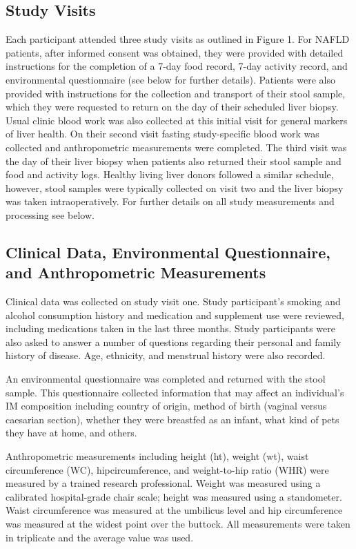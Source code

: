 \subsection{Study Visits}
Each participant attended three study visits as outlined in Figure 1. For NAFLD patients, after informed consent was obtained, they were provided with detailed instructions for the completion of a 7-day food record, 7-day activity record, and environmental questionnaire (see below for further details). Patients were also provided with instructions for the collection and transport of their stool sample, which they were requested to return on the day of their scheduled liver biopsy. Usual clinic blood work was also collected at this initial visit for general markers of liver health. On their second visit fasting study-specific blood work was collected and anthropometric measurements were completed. The third visit was the day of their liver biopsy when patients also returned their stool sample and food and activity logs. Healthy living liver donors followed a similar schedule, however, stool samples were typically collected on visit two and the liver biopsy was taken intraoperatively. For further details on all study measurements and processing see below.

\subsection{Clinical Data, Environmental Questionnaire, and Anthropometric Measurements}
Clinical data was collected on study visit one. Study participant’s smoking and alcohol consumption history and medication and supplement use were reviewed, including medications taken in the last three months. Study participants were also asked to answer a number of questions regarding their personal and family history of disease. Age, ethnicity, and menstrual history were also recorded.

An environmental questionnaire was completed and returned with the stool sample. This questionnaire collected information that may affect an individual’s IM composition including country of origin, method of birth (vaginal versus caesarian section), whether they were breastfed as an infant, what kind of pets they have at home, and others.

Anthropometric measurements including height (ht), weight (wt), waist circumference (WC), hipcircumference, and weight-to-hip ratio (WHR) were measured by a trained research professional. Weight was measured using a calibrated hospital-grade chair scale; height was measured using a standometer. Waist circumference was measured at the umbilicus level and hip circumference was measured at the widest point over the buttock. All measurements were taken in triplicate and the average value was used.

